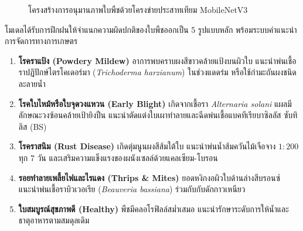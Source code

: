 \begin{figure}[H]
\centering
{}
\caption{โครงสร้างการอนุมานภาพใบพืชด้วยโครงข่ายประสาทเทียม MobileNetV3}
\label{fig:mobilenet_inference_pipeline}
\end{figure}

โมเดลได้รับการฝึกฝนให้จำแนกความผิดปกติของใบพืชออกเป็น 5 รูปแบบหลัก พร้อมระบบคำแนะนำการจัดการทางการเกษตร
\begin{enumerate}
    \item \textbf{โรคราแป้ง (Powdery Mildew)}  อาการพบคราบผงสีขาวคล้ายแป้งบนผิวใบ แนะนำพ่นเชื้อราปฏิปักษ์ไตรโคเดอร์มา (\textit{Trichoderma harzianum}) ในช่วงแดดร่ม หรือใช้กำมะถันผงชนิดละลายน้ำ
    \item \textbf{โรคใบไหม้หรือใบจุดวงแหวน (Early Blight)}  เกิดจากเชื้อรา \textit{Alternaria solani} แผลมีลักษณะวงซ้อนคล้ายเป้ายิงปืน แนะนำตัดแต่งใบเผาทำลายและฉีดพ่นเชื้อแบคทีเรียบาซิลลัส ซับทิลิส (BS)
    \item \textbf{โรคราสนิม (Rust Disease)}  เกิดตุ่มนูนผงสีส้มใต้ใบ แนะนำพ่นน้ำส้มควันไม้เจือจาง $1:200$ ทุก 7 วัน และเสริมความแข็งแรงของผนังเซลล์ด้วยแคลเซียม-โบรอน
    \item \textbf{รอยทำลายเพลี้ยไฟและไรแดง (Thrips \& Mites)}  ยอดหงิกงอผิวใบด้านล่างสีบรอนซ์ แนะนำพ่นเชื้อราบิวเวอเรีย (\textit{Beauveria bassiana}) ร่วมกับกับดักกาวเหนียว
    \item \textbf{ใบสมบูรณ์สุขภาพดี (Healthy)}  พืชมีคลอโรฟิลล์สม่ำเสมอ แนะนำรักษาระดับการให้น้ำและธาตุอาหารตามสมดุลเดิม
\end{enumerate}

